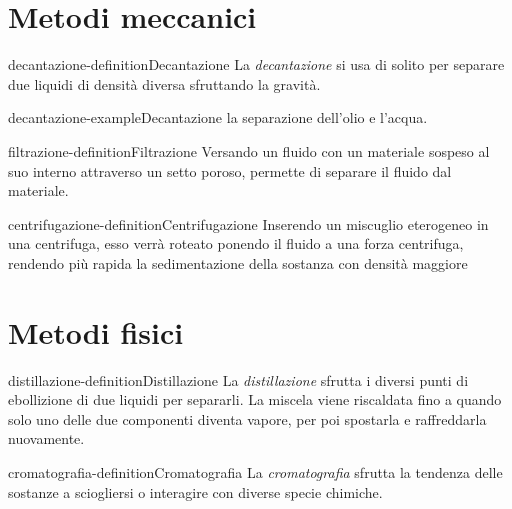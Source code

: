 \documentclass[preview]{standalone}
\begin{document}
\genpage

\section{Metodi meccanici}


\begin{snippetdefinition}{decantazione-definition}{Decantazione}
    La \textit{decantazione} si usa di solito per separare due liquidi di densità diversa
    sfruttando la gravità.
\end{snippetdefinition}

\begin{snippetexample}{decantazione-example}{Decantazione}
    la separazione dell'olio e l'acqua.
\end{snippetexample}

\begin{snippetdefinition}{filtrazione-definition}{Filtrazione}
    Versando un fluido con un materiale sospeso al suo interno attraverso un setto poroso,
    permette di separare il fluido dal materiale.
\end{snippetdefinition}

\begin{snippetdefinition}{centrifugazione-definition}{Centrifugazione}
    Inserendo un miscuglio eterogeneo in una centrifuga, esso verrà roteato ponendo il
    fluido a una forza centrifuga, rendendo più rapida la sedimentazione della sostanza con densità maggiore
\end{snippetdefinition}

\section{Metodi fisici}


\begin{snippetdefinition}{distillazione-definition}{Distillazione}
    La \textit{distillazione} sfrutta i diversi punti di ebollizione di due liquidi per separarli.
    La miscela viene riscaldata fino a quando solo uno delle due componenti diventa vapore, per poi
    spostarla e raffreddarla nuovamente.
\end{snippetdefinition}

\begin{snippetdefinition}{cromatografia-definition}{Cromatografia}
    La \textit{cromatografia} sfrutta la tendenza delle sostanze a sciogliersi o interagire
    con diverse specie chimiche.
\end{snippetdefinition}
\end{document}
